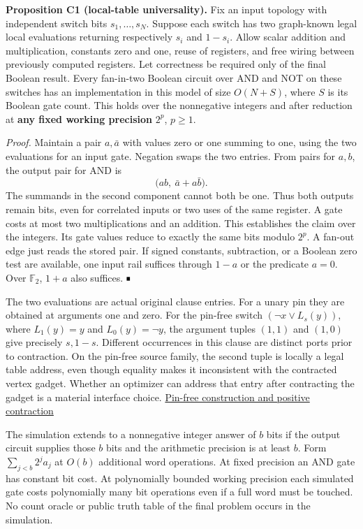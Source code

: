 \documentclass[11pt,a4paper]{article}
\renewcommand{\blacksquare}{\mathord{\vcenter{\hbox{\rule{.8ex}{.8ex}}}}}
\begin{document}
\textbf{Proposition C1 (local-table universality).} Fix an input
topology with independent switch bits \(s_1,\ldots,s_N\). Suppose each
switch has two graph-known legal local evaluations returning
respectively \(s_i\) and \(1-s_i\). Allow scalar addition and
multiplication, constants zero and one, reuse of registers, and free
wiring between previously computed registers. Let correctness be
required only of the final Boolean result. Every fan-in-two Boolean
circuit over AND and NOT on these switches has an implementation in this
model of size \(O(N+S)\), where \(S\) is its Boolean gate count. This
holds over the nonnegative integers and after reduction at \textbf{any
fixed working precision} \(2^p\), \(p\ge1\).

\emph{Proof.} Maintain a pair \(a,\bar a\) with values zero or one
summing to one, using the two evaluations for an input gate. Negation
swaps the two entries. From pairs for \(a,b\), the output pair for AND
is \[
       \bigl(ab,\ \bar a+a\bar b\bigr).
\] The summands in the second component cannot both be one. Thus both
outputs remain bits, even for correlated inputs or two uses of the same
register. A gate costs at most two multiplications and an addition. This
establishes the claim over the integers. Its gate values reduce to
exactly the same bits modulo \(2^p\). A fan-out edge just reads the
stored pair. If signed constants, subtraction, or a Boolean zero test
are available, one input rail suffices through \(1-a\) or the predicate
\(a=0\). Over \(\mathbb F_2\), \(1+a\) also suffices. \(\blacksquare\)

The two evaluations are actual original clause entries. For a unary pin
they are obtained at arguments one and zero. For the pin-free switch
\((\neg x\vee L_s(y))\), where \(L_1(y)=y\) and \(L_0(y)=\neg y\), the
argument tuples \((1,1)\) and \((1,0)\) give precisely \(s,1-s\).
Different occurrences in this clause are distinct ports prior to
contraction. On the pin-free source family, the second tuple is locally
a legal table address, even though equality makes it inconsistent with
the contracted vertex gadget. Whether an optimizer can address that
entry after contracting the gadget is a material interface choice.
\hyperref[v8-section-stronger-family]{Pin-free construction and positive
contraction}

The simulation extends to a nonnegative integer answer of \(b\) bits if
the output circuit supplies those \(b\) bits and the arithmetic
precision is at least \(b\). Form \(\sum_{j<b}2^j a_j\) at \(O(b)\)
additional word operations. At fixed precision an AND gate has constant
bit cost. At polynomially bounded working precision each simulated gate
costs polynomially many bit operations even if a full word must be
touched. No count oracle or public truth table of the final problem
occurs in the simulation.
\end{document}
